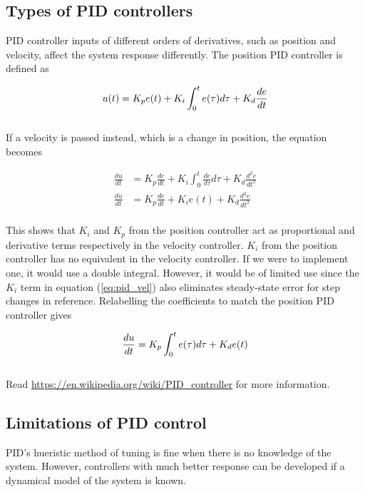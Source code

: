 \documentclass[10pt,conference,compsoc]{IEEEtran}
\begin{document}
\subsection{Types of PID controllers}

\noindent PID controller inputs of different orders of derivatives, such as
position and velocity, affect the \gls{system} response differently. The
position PID controller is defined as

\begin{equation}
  u(t) = K_p e(t) + K_i \int_0^t e(\tau) d\tau + K_d \frac{de}{dt} \\
\end{equation}
\\
\noindent If a velocity is passed instead, which is a change in position, the
equation becomes

\begin{align}
  \frac{du}{dt} &= K_p \frac{de}{dt} + K_i \int_0^t \frac{de}{d\tau} d\tau +
    K_d \frac{d^2e}{dt^2} \nonumber \\
  \frac{du}{dt} &= K_p \frac{de}{dt} + K_i e(t) + K_d \frac{d^2e}{dt^2}
    \label{eq:pid_vel}
\end{align}
\\
\noindent This shows that $K_i$ and $K_p$ from the position controller act as
proportional and derivative terms respectively in the velocity controller. $K_i$
from the position controller has no equivalent in the velocity controller. If we
were to implement one, it would use a double integral. However, it would be of
limited use since the $K_i$ term in equation (\ref{eq:pid_vel}) also eliminates
steady-state error for step changes in \gls{reference}. Relabelling the
coefficients to match the position PID controller gives

\begin{equation}
  \frac{du}{dt} = K_p \int_0^t e(\tau) d\tau + K_d e(t) \\
\end{equation}
\\
\noindent Read \url{https://en.wikipedia.org/wiki/PID_controller} for more
information.

\subsection{Limitations of PID control}

\noindent PID's hueristic method of tuning is fine when there is no knowledge of
the \gls{system}. However, controllers with much better response can be
developed if a dynamical model of the \gls{system} is known.
\end{document}
